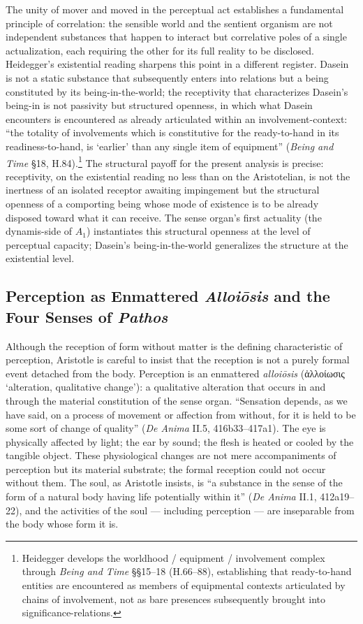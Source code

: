 \documentclass{article}
\newcommand{\gk}[1]{{\greekfont #1}}
\begin{document}
The unity of mover and moved in the perceptual act establishes a fundamental principle of correlation: the sensible world and the sentient organism are not independent substances that happen to interact but correlative poles of a single actualization, each requiring the other for its full reality to be disclosed. Heidegger's existential reading sharpens this point in a different register. Dasein is not a static substance that subsequently enters into relations but a being constituted by its being-in-the-world; the receptivity that characterizes Dasein's being-in is not passivity but structured openness, in which what Dasein encounters is encountered as already articulated within an involvement-context: ``the totality of involvements which is constitutive for the ready-to-hand in its readiness-to-hand, is `earlier' than any single item of equipment'' (\textit{Being and Time} \S 18, H.84).\footnote{Heidegger develops the worldhood / equipment / involvement complex through \textit{Being and Time} \S\S 15--18 (H.66--88), establishing that ready-to-hand entities are encountered as members of equipmental contexts articulated by chains of involvement, not as bare presences subsequently brought into significance-relations.} The structural payoff for the present analysis is precise: receptivity, on the existential reading no less than on the Aristotelian, is not the inertness of an isolated receptor awaiting impingement but the structural openness of a comporting being whose mode of existence is to be already disposed toward what it can receive. The sense organ's first actuality (the dynamis-side of $A_1$) instantiates this structural openness at the level of perceptual capacity; Dasein's being-in-the-world generalizes the structure at the existential level.

\subsection{Perception as Enmattered \textit{Alloiōsis} and the Four Senses of \textit{Pathos}}

Although the reception of form without matter is the defining characteristic of perception, Aristotle is careful to insist that the reception is not a purely formal event detached from the body. Perception is an enmattered \textit{alloiōsis} (\gk{ἀλλοίωσις} `alteration, qualitative change'): a qualitative alteration that occurs in and through the material constitution of the sense organ. ``Sensation depends, as we have said, on a process of movement or affection from without, for it is held to be some sort of change of quality'' (\textit{De Anima} II.5, 416b33--417a1). The eye is physically affected by light; the ear by sound; the flesh is heated or cooled by the tangible object. These physiological changes are not mere accompaniments of perception but its material substrate; the formal reception could not occur without them. The soul, as Aristotle insists, is ``a substance in the sense of the form of a natural body having life potentially within it'' (\textit{De Anima} II.1, 412a19--22), and the activities of the soul --- including perception --- are inseparable from the body whose form it is.
\end{document}
